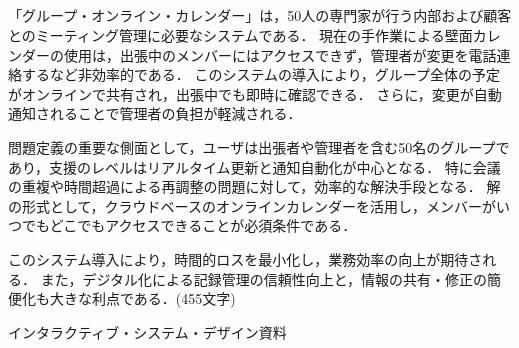 \documentclass[titlepage,a4paper]{jsarticle}
\begin{document}
\subsection{}
「グループ・オンライン・カレンダー」は，50人の専門家が行う内部および顧客とのミーティング管理に必要なシステムである．
現在の手作業による壁面カレンダーの使用は，出張中のメンバーにはアクセスできず，管理者が変更を電話連絡するなど非効率的である．
このシステムの導入により，グループ全体の予定がオンラインで共有され，出張中でも即時に確認できる．
さらに，変更が自動通知されることで管理者の負担が軽減される．

問題定義の重要な側面として，ユーザは出張者や管理者を含む50名のグループであり，支援のレベルはリアルタイム更新と通知自動化が中心となる．
特に会議の重複や時間超過による再調整の問題に対して，効率的な解決手段となる．
解の形式として，クラウドベースのオンラインカレンダーを活用し，メンバーがいつでもどこでもアクセスできることが必須条件である．

このシステム導入により，時間的ロスを最小化し，業務効率の向上が期待される．
また，デジタル化による記録管理の信頼性向上と，情報の共有・修正の簡便化も大きな利点である．(455文字)

\begin{thebibliography}{99}
  インタラクティブ・システム・デザイン資料
\end{thebibliography}
\end{document}
